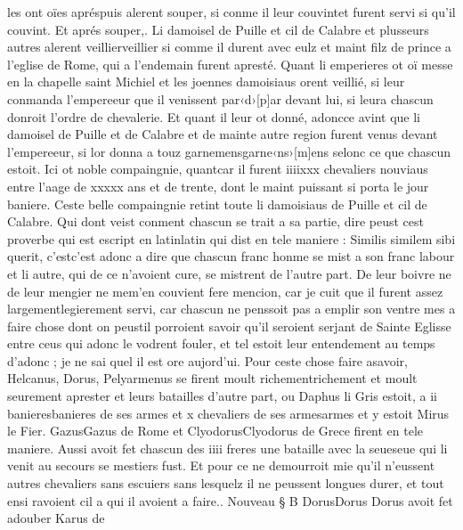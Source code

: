 \documentclass{article}
\begin{document}
\begin{pages}
   les ont oïes apréspuis alerent souper, 
   si conme il leur couvintet furent servi si qu'il couvint. Et aprés souper,. 
   Li damoisel de Puille
   et cil de Calabre et plusseurs autres alerent 
   veillierveillier si comme il durent avec eulz 
   et maint filz de prince a l’eglise
   de Rome, qui a l’endemain 
   furent apresté.
   Quant li emperieres ot oï messe en la chapelle 
   saint Michiel 
   et les joennes damoisiaus orent veillié, 
   si leur conmanda l’empereeur 
      que il venissent par‹d›[p]ar devant lui, 
   si leura chascun 
   donroit l’ordre de chevalerie. \pend
\pstart Et quant il leur ot donné, adoncce 
   avint que li damoisel de Puille 
   et de Calabre et de mainte autre region furent venus devant 
   l’empereeur, si lor donna a touz 
   garnemensgarne‹ns›[m]ens selonc ce que chascun estoit. 
   Ici ot noble compaingnie, quantcar il furent 
   iiiixxx chevaliers nouviaus entre l’aage de 
   xxxxx ans et de trente, 
   dont le maint puissant si porta le jour baniere. Ceste belle compaingnie retint toute
   li damoisiaus de Puille et
   cil de Calabre.
   Qui dont veist conment chascun se trait a sa partie, dire peust cest proverbe qui est escript en 
   latinlatin qui dist en tele maniere :
   Similis similem sibi querit, 
   c'estc'est adonc a dire que chascun franc honme se mist a son franc 
   labour et li autre, 
   qui de ce n’avoient cure, se mistrent de l’autre part. De leur boivre ne de leur mengier ne 
      mem'en couvient fere mencion, 
      car je cuit que il furent assez largementlegierement servi, 
   car chascun ne penssoit pas a emplir son ventre
   mes a faire chose dont on peustil porroient savoir qu’il seroient serjant de Sainte Eglisse entre ceus qui adonc le vodrent fouler, 
   et tel estoit leur entendement au temps d’adonc ; je ne sai quel il est ore aujord’ui. \pend
\pstart Pour ceste chose faire asavoir, Helcanus, 
   Dorus, Pelyarmenus se firent
   moult richementrichement et moult seurement aprester 
   et leurs batailles d’autre part, ou Daphus li Gris estoit, 
   a ii banieresbanieres de ses armes 
   et x chevaliers de ses armesarmes et y estoit Mirus le Fier. 
   GazusGazus de Rome et 
   ClyodorusClyodorus de Grece 
   firent en tele maniere. 
   Aussi avoit fet chascun des iiii freres une bataille 
   avec la seueseue qui li venit au secours se mestiers fust. 
   Et pour ce ne demourroit mie qu'il n'eussent autres chevaliers sans escuiers sans lesquelz il ne peussent longues durer, et tout
   ensi ravoient cil a qui il avoient a faire.. 
   Nouveau § B
   DorusDorus Dorus avoit fet adouber 
   Karus de 

\end{pages}
\end{document}
